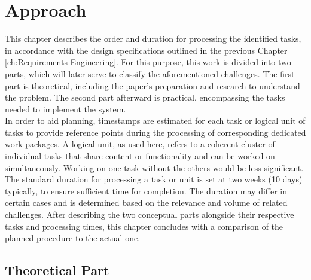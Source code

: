 

\chapter{Approach}
\label{ch:Approach}

This chapter describes the order and duration for processing the identified tasks, in accordance with the design specifications outlined in the previous Chapter \ref{ch:Requirements Engineering}.
For this purpose, this work is divided into two parts, which will later serve to classify the aforementioned challenges.
The first part is theoretical, including the paper's preparation and research to understand the problem.
The second part afterward is practical, encompassing the tasks needed to implement the system. \\
\noindent In order to aid planning, timestamps are estimated for each task or logical unit of tasks to provide reference points during the processing of corresponding dedicated work packages.
A logical unit, as used here, refers to a coherent cluster of individual tasks that share content or functionality and can be worked on simultaneously. Working on one task without the others would be less significant.
The standard duration for processing a task or unit is set at two weeks (10 days) typically, to ensure sufficient time for completion. The duration may differ in certain cases and is determined based on the relevance and volume of related challenges.
After describing the two conceptual parts alongside their respective tasks and processing times, this chapter concludes with a comparison of the planned procedure to the actual one.

\section{Theoretical Part}
\label{ch:Approach:sec:Theoretical Part}

